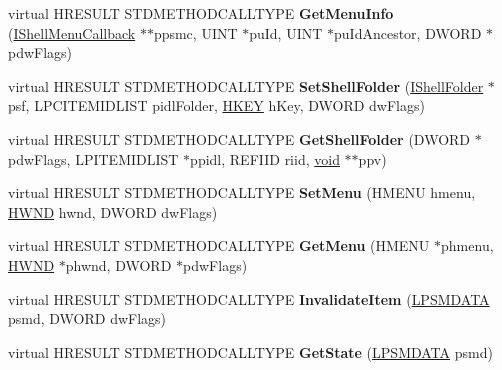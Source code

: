 \begin{DoxyCompactItemize}
virtual H\+R\+E\+S\+U\+LT S\+T\+D\+M\+E\+T\+H\+O\+D\+C\+A\+L\+L\+T\+Y\+PE {\bfseries Get\+Menu\+Info} (\hyperlink{interface_i_shell_menu_callback}{I\+Shell\+Menu\+Callback} $\ast$$\ast$ppsmc, U\+I\+NT $\ast$pu\+Id, U\+I\+NT $\ast$pu\+Id\+Ancestor, D\+W\+O\+RD $\ast$pdw\+Flags)
\item 
\mbox{\label{class_c_menu_band_a976e6701984bd1ba1cebb68d047cd6f6}} 
virtual H\+R\+E\+S\+U\+LT S\+T\+D\+M\+E\+T\+H\+O\+D\+C\+A\+L\+L\+T\+Y\+PE {\bfseries Set\+Shell\+Folder} (\hyperlink{interface_i_shell_folder}{I\+Shell\+Folder} $\ast$psf, L\+P\+C\+I\+T\+E\+M\+I\+D\+L\+I\+ST pidl\+Folder, \hyperlink{interfacevoid}{H\+K\+EY} h\+Key, D\+W\+O\+RD dw\+Flags)
\item 
\mbox{\label{class_c_menu_band_a0e97956ef16a9162d190a4a2949b7771}} 
virtual H\+R\+E\+S\+U\+LT S\+T\+D\+M\+E\+T\+H\+O\+D\+C\+A\+L\+L\+T\+Y\+PE {\bfseries Get\+Shell\+Folder} (D\+W\+O\+RD $\ast$pdw\+Flags, L\+P\+I\+T\+E\+M\+I\+D\+L\+I\+ST $\ast$ppidl, R\+E\+F\+I\+ID riid, \hyperlink{interfacevoid}{void} $\ast$$\ast$ppv)
\item 
\mbox{\label{class_c_menu_band_aa847026f92c60aecb19d0ba465970a5f}} 
virtual H\+R\+E\+S\+U\+LT S\+T\+D\+M\+E\+T\+H\+O\+D\+C\+A\+L\+L\+T\+Y\+PE {\bfseries Set\+Menu} (H\+M\+E\+NU hmenu, \hyperlink{interfacevoid}{H\+W\+ND} hwnd, D\+W\+O\+RD dw\+Flags)
\item 
\mbox{\label{class_c_menu_band_af4c2ee55d76147c0463c23b9f2bfda7b}} 
virtual H\+R\+E\+S\+U\+LT S\+T\+D\+M\+E\+T\+H\+O\+D\+C\+A\+L\+L\+T\+Y\+PE {\bfseries Get\+Menu} (H\+M\+E\+NU $\ast$phmenu, \hyperlink{interfacevoid}{H\+W\+ND} $\ast$phwnd, D\+W\+O\+RD $\ast$pdw\+Flags)
\item 
\mbox{\label{class_c_menu_band_a75cd562977fc6565c97b36d206df5c9f}} 
virtual H\+R\+E\+S\+U\+LT S\+T\+D\+M\+E\+T\+H\+O\+D\+C\+A\+L\+L\+T\+Y\+PE {\bfseries Invalidate\+Item} (\hyperlink{structtag_s_m_d_a_t_a}{L\+P\+S\+M\+D\+A\+TA} psmd, D\+W\+O\+RD dw\+Flags)
\item 
\mbox{\label{class_c_menu_band_ad1371d92bad29cdd9150c498b3598657}} 
virtual H\+R\+E\+S\+U\+LT S\+T\+D\+M\+E\+T\+H\+O\+D\+C\+A\+L\+L\+T\+Y\+PE {\bfseries Get\+State} (\hyperlink{structtag_s_m_d_a_t_a}{L\+P\+S\+M\+D\+A\+TA} psmd)

\end{DoxyCompactItemize}
